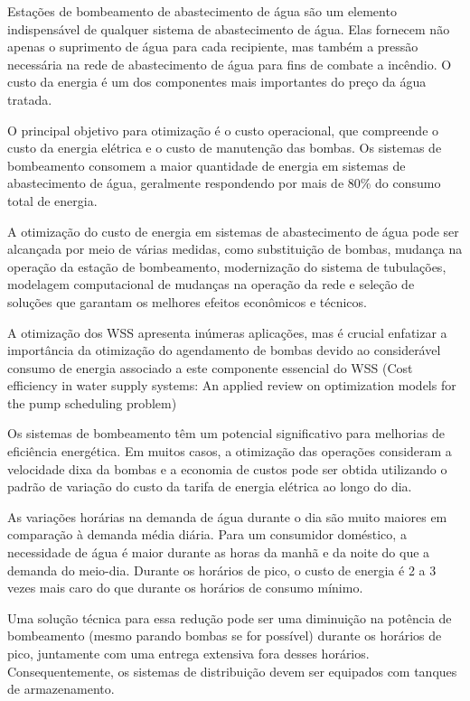 Estações de bombeamento de abastecimento de água são um elemento indispensável de qualquer sistema de abastecimento de água. Elas fornecem não apenas o suprimento de água para cada recipiente, mas também a pressão necessária na rede de abastecimento de água para fins de combate a incêndio. O custo da energia é um dos componentes mais importantes do preço da água tratada.\cite{rfc7}

O principal objetivo para otimização é o custo operacional, que compreende o custo da energia elétrica e o custo de manutenção das bombas.\cite{rfc2} Os sistemas de bombeamento consomem a maior quantidade de energia em sistemas de abastecimento de água, geralmente respondendo por mais de 80\% do consumo total de energia.\cite{rfc8}

A otimização do custo de energia em sistemas de abastecimento de água pode ser alcançada por meio de várias medidas, como substituição de bombas, mudança na operação da estação de bombeamento, modernização do sistema de tubulações, modelagem computacional de mudanças na operação da rede e seleção de soluções que garantam os melhores efeitos econômicos e técnicos.\cite{rfc7}

A otimização dos WSS apresenta inúmeras aplicações, mas é crucial enfatizar a importância da otimização do agendamento de bombas devido ao considerável consumo de energia associado a este componente essencial do WSS (Cost efficiency in water supply systems: An applied review on optimization models for the pump scheduling problem)

Os sistemas de bombeamento têm um potencial significativo para melhorias de eficiência energética. Em muitos casos, a otimização das operações consideram a velocidade dixa da bombas e a economia de custos pode ser obtida utilizando o padrão de variação do custo da tarifa de energia elétrica ao longo do dia.\cite{rfc8}

As variações horárias na demanda de água durante o dia são muito maiores em comparação à demanda média diária. Para um consumidor doméstico, a necessidade de água é maior durante as horas da manhã e da noite do que a demanda do meio-dia. Durante os horários de pico, o custo de energia é 2 a 3 vezes mais caro do que durante os horários de consumo mínimo.

Uma solução técnica para essa redução pode ser uma diminuição na potência de bombeamento (mesmo parando bombas se for possível) durante os horários de pico, juntamente com uma entrega extensiva fora desses horários. Consequentemente, os sistemas de distribuição devem ser equipados com tanques de armazenamento.


